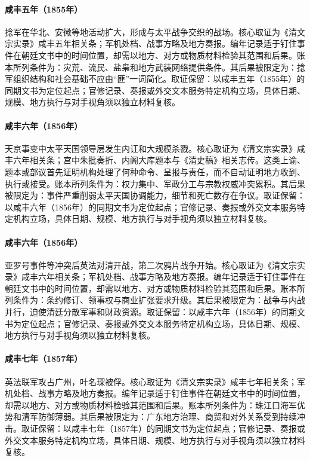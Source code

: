 \hypertarget{ledger:EQ-1855-NIAN-REBELLION-EXPANSION}{}\paragraph{咸丰五年（1855年）}捻军在华北、安徽等地活动扩大，形成与太平战争交织的战场。核心取证为《清文宗实录》咸丰五年相关条；军机处档、战事方略及地方奏报。编年记录适于钉住事件在朝廷文书中的时间位置，却需以地方、对方或物质材料检验其范围和后果。账本所列条件为：灾荒、流民、盐枭和地方武装网络提供条件。其后果被限定为：捻军组织结构和社会基础不应由“匪”一词简化。取证保留：以咸丰五年（1855年）的同期文书为定位起点；官修记录、奏报或外交文本服务特定机构立场，具体日期、规模、地方执行与对手视角须以独立材料复核。
\hypertarget{ledger:EQ-1856-TIANJING-INCIDENT}{}\paragraph{咸丰六年（1856年）}天京事变中太平天国领导层发生内讧和大规模杀戮。核心取证为《清文宗实录》咸丰六年相关条；宫中朱批奏折、内阁大库题本与《清史稿》相关志传。这类上谕、题本或部议首先证明机构处理了何种命令、呈报与责任，而不自动证明地方收到、执行或接受。账本所列条件为：权力集中、军政分工与宗教权威冲突累积。其后果被限定为：事件严重削弱太平天国协调能力，细节和死亡数存在争议。取证保留：以咸丰六年（1856年）的同期文书为定位起点；官修记录、奏报或外交文本服务特定机构立场，具体日期、规模、地方执行与对手视角须以独立材料复核。
\hypertarget{ledger:EQ-1856-SECOND-OPIUM-WAR-BEGIN}{}\paragraph{咸丰六年（1856年）}亚罗号事件等冲突后英法对清开战，第二次鸦片战争开始。核心取证为《清文宗实录》咸丰六年相关条；军机处档、战事方略及地方奏报。编年记录适于钉住事件在朝廷文书中的时间位置，却需以地方、对方或物质材料检验其范围和后果。账本所列条件为：条约修订、领事权与商业扩张要求升级。其后果被限定为：战争与内战并行，迫使清廷分散军事和财政资源。取证保留：以咸丰六年（1856年）的同期文书为定位起点；官修记录、奏报或外交文本服务特定机构立场，具体日期、规模、地方执行与对手视角须以独立材料复核。
\hypertarget{ledger:EQ-1857-GUANGZHOU-FALL}{}\paragraph{咸丰七年（1857年）}英法联军攻占广州，叶名琛被俘。核心取证为《清文宗实录》咸丰七年相关条；军机处档、战事方略及地方奏报。编年记录适于钉住事件在朝廷文书中的时间位置，却需以地方、对方或物质材料检验其范围和后果。账本所列条件为：珠江口海军优势和清军防御薄弱。其后果被限定为：广东地方治理、商贸和对外关系受到持续冲击。取证保留：以咸丰七年（1857年）的同期文书为定位起点；官修记录、奏报或外交文本服务特定机构立场，具体日期、规模、地方执行与对手视角须以独立材料复核。
